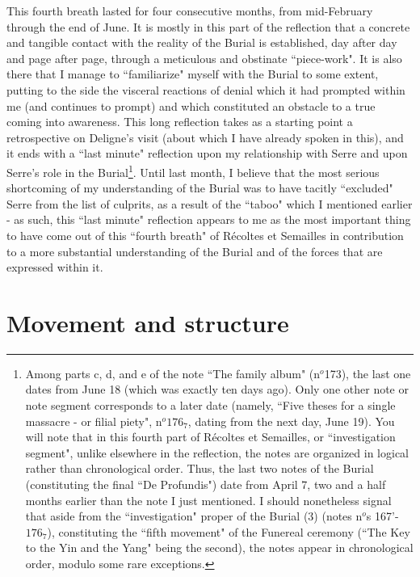 This fourth breath lasted for four consecutive months, from mid-February through the end of June. It is mostly in this part of the reflection that a concrete and tangible contact with the reality of the Burial is established, day after day and page after page, through a meticulous and obstinate ``piece-work". It is also there that I manage to ``familiarize" myself with the Burial to some extent, putting to the side the visceral reactions of denial which it had prompted within me (and continues to prompt) and which constituted an obstacle to a true coming into awareness. This long reflection takes as a starting point a retrospective on Deligne's visit (about which I have already spoken in this), and it ends with a ``last minute" reflection upon my relationship with Serre and upon Serre's role in the Burial\footnote{Among parts c, d, and e of the note ``The family album" (n$^o$173), the last one dates from June 18 (which was exactly ten days ago). Only one other note or note segment corresponds to a later date (namely, ``Five theses for a single massacre - or filial piety", n$^o 176_7$, dating from the next day, June 19). You will note that in this fourth part of R\'ecoltes et Semailles, or ``investigation segment", unlike elsewhere in the reflection, the notes are organized in logical rather than chronological order. Thus, the last two notes of the Burial (constituting the final ``De Profundis") date from April 7, two and a half months earlier than the note I just mentioned. I should nonetheless signal that aside from the ``investigation" proper of the Burial (3) (notes n$^o$s 167'-$176_7$), constituting the ``fifth movement" of the Funereal ceremony (``The Key to the Yin and the Yang" being the second), the notes appear in chronological order, modulo some rare exceptions.}. Until last month, I believe that the most serious shortcoming of my understanding of the Burial was to have tacitly ``excluded" Serre from the list of culprits, as a result of the ``taboo" which I mentioned earlier - as such, this ``last minute" reflection appears to me as the most important thing to have come out of this ``fourth breath" of R\'ecoltes et Semailles in contribution to a more substantial understanding of the Burial and of the forces that are expressed within it.


\section{Movement and structure}

